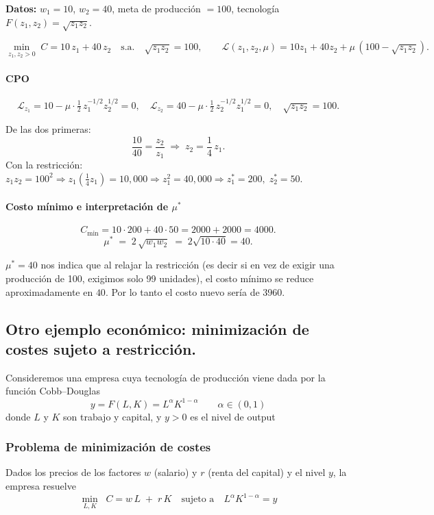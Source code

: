 \documentclass{article}
\begin{document}
\textbf{Datos:} \(w_1=10\), \(w_2=40\), meta de producción \(=100\), tecnología \(F(z_1,z_2)=\sqrt{z_1 z_2}\).

\[
\min_{z_1,z_2>0}\; C=10\,z_1+40\,z_2
\quad \text{s.a.}\quad \sqrt{z_1 z_2}=100,
\qquad
\mathcal L(z_1,z_2,\mu)=10z_1+40z_2+\mu\,(100-\sqrt{z_1 z_2}).
\]

\paragraph{CPO}
\[
\mathcal L_{z_1}=10-\mu\cdot \tfrac{1}{2}\,z_1^{-1/2}z_2^{1/2}=0,\quad
\mathcal L_{z_2}=40-\mu\cdot \tfrac{1}{2}\,z_2^{-1/2}z_1^{1/2}=0,\quad
\sqrt{z_1 z_2}=100.
\]

De las dos primeras:
\[
\frac{10}{40}=\frac{z_2}{z_1}\;\Longrightarrow\; z_2=\frac{1}{4}\,z_1.
\]
Con la restricción: \(z_1 z_2=100^2\Rightarrow z_1\!\left(\tfrac{1}{4}z_1\right)=10{,}000 \Rightarrow z_1^2=40{,}000\Rightarrow
z_1^*=200,\; z_2^*=50.\)

\paragraph{Costo mínimo e interpretación de \(\mu^*\)}
\[
C_{\min}=10\cdot 200+40\cdot 50=2000+2000=4000.
\]
\[
\mu^* \;=\; 2\,\sqrt{w_1 w_2}\;=\;2\sqrt{10\cdot 40}=40.
\]

{\color{teal}\(\mu^*=40\) nos indica que al relajar la restricción (es decir si en vez de exigir una producción de 100, exigimos solo 99 unidades), el costo mínimo se reduce aproximadamente en \(40\). Por lo tanto el costo nuevo sería de 3960.}





\subsection*{Otro ejemplo económico: minimización de costes sujeto a restricción.}

Consideremos una empresa cuya tecnología de producción viene dada por la función Cobb–Douglas
\[
y = F(L,K) = L^\alpha K^{1-\alpha}
\qquad \alpha\in(0,1)
\]
donde \(L\) y \(K\) son trabajo y capital, y \(y>0\) es el nivel de output  

\subsubsection*{Problema de minimización de costes}

Dados los precios de los factores \(w\) (salario) y \(r\) (renta del capital) y el nivel \(y\), la empresa resuelve
\[
\min_{L,K}\;\; C = w\,L \;+\; r\,K
\quad\text{sujeto a}\quad
L^\alpha K^{1-\alpha} = y
\]
\end{document}
